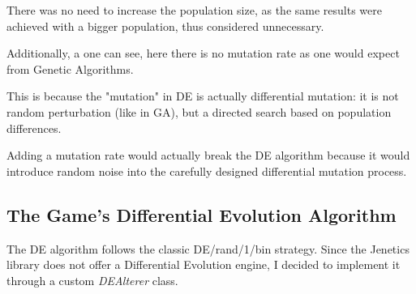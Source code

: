 \documentclass[sigconf]{acmart} %
\begin{document}
There was no need to increase the population size, as the same results were achieved with a bigger population, thus considered unnecessary.

Additionally, a one can see, here there is no mutation rate as one would expect from Genetic Algorithms. 

This is because the "mutation" in DE is actually differential mutation: it is not random perturbation (like in GA), but a directed search based on population differences.

Adding a mutation rate would actually break the DE algorithm because it would introduce random noise into the carefully designed differential mutation process.

\subsection{The Game's Differential Evolution Algorithm}
The DE algorithm follows the classic DE/rand/1/bin strategy. Since the Jenetics library does not offer a Differential Evolution engine, I decided to implement it through a custom \textit{DEAlterer} class.
\end{document}
